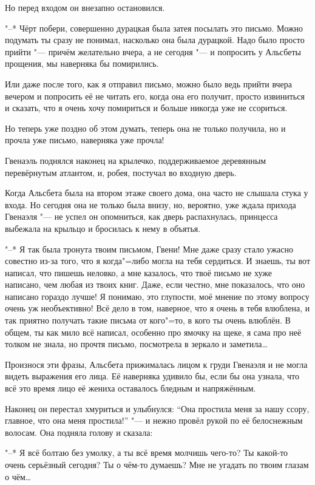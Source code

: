 Но перед входом он внезапно остановился.

"--* Чёрт побери, совершенно дурацкая была затея посылать это письмо.
Можно подумать ты сразу не понимал, насколько она была дурацкой.
Надо было просто прийти "--- причём желательно вчера, а не сегодня "--- и
попросить у Альсбеты прощения, мы наверняка бы помирились.

Или даже после того, как я отправил письмо, можно было ведь прийти вчера вечером
и попросить её не читать его, когда она его получит, просто извиниться и
сказать, что я очень хочу помириться и больше никогда уже не ссориться.

Но теперь уже поздно об этом думать, теперь она не только получила, но и прочла
уже письмо, наверняка уже прочла!

Гвенаэль поднялся наконец на крылечко, поддерживаемое деревянным перевёрнутым
атлантом, и, робея, постучал во входную дверь.

Когда Альсбета была на втором этаже своего дома, она часто не слышала стука у
входа.
Но сегодня она не только была внизу, но, вероятно, уже ждала прихода Гвенаэля
"--- не успел он опомниться, как дверь распахнулась, принцесса выбежала на
крыльцо и бросилась к нему в объятья.

"--* Я так была тронута твоим письмом, Гвени!
Мне даже сразу стало ужасно совестно из-за того, что я когда"=либо могла на тебя
сердиться.
И знаешь, ты вот написал, что пишешь неловко, а мне казалось, что твоё письмо не
хуже написано, чем любая из твоих книг.
Даже, если честно, мне показалось, что оно написано гораздо лучше!
Я понимаю, это глупости, моё мнение по этому вопросу очень уж необъективно!
Всё дело в том, наверное, что я очень в тебя влюблена, и так приятно получать
такие письма от кого"=то, в кого ты очень влюблён.
В общем, ты как мило всё написал, особенно про ямочку на щеке, я сама про неё
толком не знала, но прочтя письмо, посмотрела в зеркало и заметила\ldots

Произнося эти фразы, Альсбета прижималась лицом к груди Гвенаэля и не могла
видеть выражения его лица.
Её наверняка удивило бы, если бы она узнала, что всё это время лицо её жениха
оставалось бледным и напряжённым.

Наконец он перестал хмуриться и улыбнулся: \enquote{Она простила меня за нашу
ссору, главное, что она меня простила!} "--- и нежно провёл рукой по её
белоснежным волосам.
Она подняла голову и сказала:

"--* Я всё болтаю без умолку, а ты всё время молчишь чего-то?
Ты какой-то очень серьёзный сегодня?
Ты о чём-то думаешь?
Мне не угадать по твоим глазам о чём\ldots

